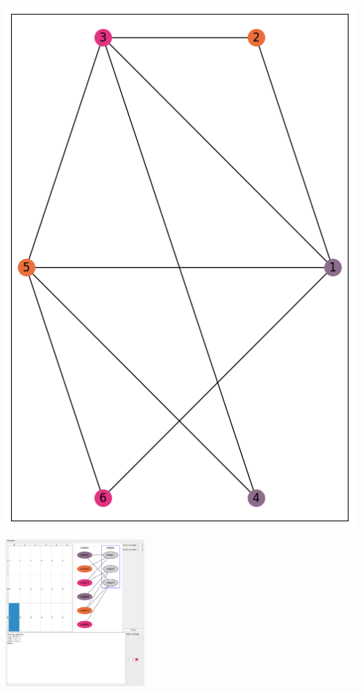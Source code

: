 \documentclass[a4paper, 12pt]{article}
\begin{document}
        \includegraphics[scale=0.5]{8_true_graph}


        \includegraphics[width=200px]{8_program}
\end{document}
